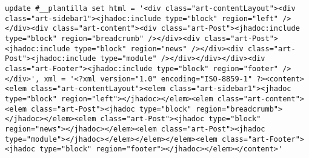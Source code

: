 \begin{lstlisting}[label=jha_plantilla_install,caption=Fragmento de plantilla almacenable en la base de datos.]
update #__plantilla set html = '<div class="art-contentLayout"><div class="art-sidebar1"><jhadoc:include type="block" region="left" /></div><div class="art-content"><div class="art-Post"><jhadoc:include type="block" region="breadcrumb" /></div><div class="art-Post"><jhadoc:include type="block" region="news" /></div><div class="art-Post"><jhadoc:include type="module" /></div></div></div><div class="art-Footer"><jhadoc:include type="block" region="footer" /></div>', xml = '<?xml version="1.0" encoding="ISO-8859-1" ?><content><elem class="art-contentLayout"><elem class="art-sidebar1"><jhadoc type="block" region="left"></jhadoc></elem><elem class="art-content"><elem class="art-Post"><jhadoc type="block" region="breadcrumb"></jhadoc></elem><elem class="art-Post"><jhadoc type="block" region="news"></jhadoc></elem><elem class="art-Post"><jhadoc type="module"></jhadoc></elem></elem></elem><elem class="art-Footer"><jhadoc type="block" region="footer"></jhadoc></elem></content>'
\end{lstlisting}
